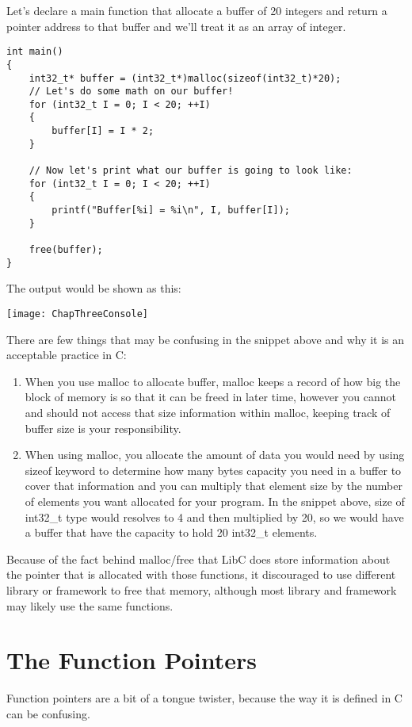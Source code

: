Let's declare a main function that allocate a buffer of 20 integers and return a pointer address to that buffer and we'll treat it as an array of integer.

\begin{lstlisting}
int main()
{
	int32_t* buffer = (int32_t*)malloc(sizeof(int32_t)*20);
	// Let's do some math on our buffer!
	for (int32_t I = 0; I < 20; ++I)
	{
		buffer[I] = I * 2;
	}
	
	// Now let's print what our buffer is going to look like:
	for (int32_t I = 0; I < 20; ++I)
	{
		printf("Buffer[%i] = %i\n", I, buffer[I]);
	}
	
	free(buffer);
}
\end{lstlisting}
\newpage
The output would be shown as this:

\texttt{[image: ChapThreeConsole]}

There are few things that may be confusing in the snippet above and why it is an acceptable practice in C:

\begin{enumerate}
	\item When you use malloc to allocate buffer, malloc keeps a record of how big the block of memory is so that it can be freed in later time, however you cannot and should not access that size information within malloc, keeping track of buffer size is your responsibility.
	
	\item When using malloc, you allocate the amount of data you would need by using sizeof keyword to determine how many bytes capacity you need in a buffer to cover that information and you can multiply that element size by the number of elements you want allocated for your program. In the snippet above, size of int32\_t type would resolves to 4 and then multiplied by 20, so we would have a buffer that have the capacity to hold 20 int32\_t elements.
\end{enumerate}

Because of the fact behind malloc/free that LibC does store information about the pointer that is allocated with those functions, it discouraged to use different library or framework to free that memory, although most library and framework may likely use the same functions.
\newpage
\section{The Function Pointers}
Function pointers are a bit of a tongue twister, because the way it is defined in C can be confusing.

